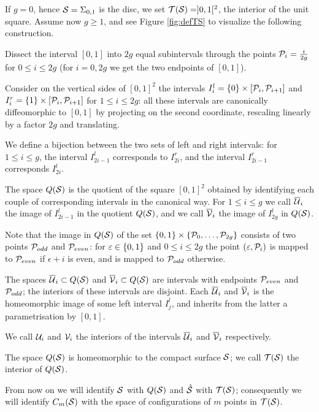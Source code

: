 \begin{defn}
\label{defn:TS}
If $g=0$, hence $\S=\Sigma_{0,1}$ is the disc, we set $\T(\S)=]0,1[^2$, the interior of the unit square. Assume
now $g\geq 1$, and see Figure \ref{fig:defTS} to visualize the following construction.

Dissect the interval $[0,1]$ into $2g$ equal subintervals through the points $\cP_i=\frac{i}{2g}$ for $0\leq i\leq 2g$
(for $i=0,2g$ we get the two endpoints of $[0,1]$).

Consider on the vertical sides of $[0,1]^2$ the intervals
$I_i^l=\set{0}\times [\cP_i,\cP_{i+1}]$ and $I_i^r=\set{1}\times [\cP_i,\cP_{i+1}]$ for $1\leq i\leq 2g$:
all these intervals are
canonically diffeomorphic
to $[0,1]$ by projecting on the second coordinate, rescaling linearly by a factor $2g$
and translating.

We define a bijection
between the two sets of left and right intervals:
for $1\leq i\leq g$, the interval $I^l_{2i-1}$ corresponds to $I^r_{2i}$,
and the interval $I^r_{2i-1}$ corresponds $I^l_{2i}$.

The space $Q(\S)$ is the quotient of the square $[0,1]^2$ obtained by identifying each couple
of corresponding intervals in the canonical way. For $1\leq i\leq g$ we call $\overline{\U}_i$ the image
of $I^l_{2i-1}$ in the quotient $Q(\S)$, and we call $\overline{\V}_i$ the image of $I^l_{2g}$ in $Q(\S)$.

Note that the image in $Q(\S)$ of the set $\set{0,1}\times\set{\cP_0,\dots,\cP_{2g}}$ consists of two
points $\cP_{odd}$ and $\cP_{even}$: for $\epsilon\in\set{0,1}$ and $0\leq i\leq 2g$ the point
$(\epsilon,\cP_i)$ is mapped to $\cP_{even}$ if $\epsilon+i$ is even, and is mapped to $\cP_{odd}$
otherwise.

The spaces $\overline{\U}_i\subset Q(\S)$ and $\overline{\V}_i\subset Q(\S)$ are intervals with endpoints $\cP_{even}$ and $\cP_{odd}$;
the interiors of these intervals are disjoint. Each $\overline{\U}_i$ and $\overline{\V}_i$ is the homeomorphic image of
some left interval $I^l_j$, and inherits from the latter a parametrisation by $[0,1]$.

We call $\U_i$ and $\V_i$ the interiors of the intervals $\overline{\U}_i$ and $\overline{\V}_i$ respectively.

The space $Q(\S)$ is homeomorphic to the compact surface $\S$; we call $\T(\S)$ the interior of
$Q(\S)$.

From now on we will identify $\S$ with $Q(\S)$ and $\mrS$ with $\T(\S)$;
consequently we will identify $\cms$ with the
space of configurations of $m$ points in $\T(\S)$.
\end{defn}

